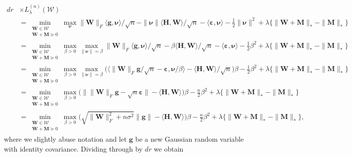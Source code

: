 \documentclass[10pt]{article}
\newcommand{\eps}{\ensuremath{\varepsilon}}
\theoremstyle{definition}
\begin{document}
\begin{align}
dr & \times L_{\lambda}^{(n)} (\mathcal{W}) \\
&= \min_ {\substack{\bm{W} \in \mathcal{W}\\ \bm{W} + \bm{M} \succcurlyeq 0}} \max_{\bm{\nu}} \| \bm{W} \|_F \langle \bm{g}, \bm{\nu} \rangle/\sqrt{n} - \| \bm{\nu}\| \langle \bm{H}, \bm{W}
    \rangle /\sqrt{n}- \langle \bm{\eps}, \bm{\nu} \rangle - \frac{1}{2} \| \bm{\nu} \|^2 + \lambda \big\{  \| \bm{W} + \bm{M}\|_* -  \| \bm{M} \|_* \big\}\\
    &=     \min_ {\substack{\bm{W} \in \mathcal{W}\\ \bm{W} + \bm{M} \succcurlyeq 0}} \max_{\beta > 0} \max_{\|\bm{\nu}\| = \beta}\| \bm{W} \|_F \langle \bm{g}, \bm{\nu} \rangle /\sqrt{n} - \beta  \langle \bm{H}, \bm{W}
    \rangle /\sqrt{n} - \langle \bm{\eps}, \bm{\nu} \rangle - \frac{1}{2} \beta^2 + \lambda \big\{ \| \bm{W} + \bm{M}\|_* -  \| \bm{M} \|_* \big\}\\
    &= \min_ {\substack{\bm{W} \in \mathcal{W}\\ \bm{W} + \bm{M} \succcurlyeq 0}} \max_{\beta > 0} \max_{\|\bm{\nu}\| = \beta} \bigg(  \big\langle\| \bm{W} \|_F \bm{g}/\sqrt{n}- \bm{\eps},  \bm{\nu}/\beta  \big\rangle - \langle \bm{H}, \bm{W}
    \rangle /\sqrt{n}\bigg) \beta  - \frac{1}{2} \beta^2 + \lambda \big\{ \| \bm{W} + \bm{M} \|_*-  \| \bm{M} \|_* \big\}\\
    &= \min_ {\substack{\bm{W} \in \mathcal{W}\\ \bm{W} + \bm{M} \succcurlyeq 0}} \max_{\beta > 0} \bigg( \big\| \| \bm{W} \|_F \bm{g}-  \sqrt{n}\bm{\eps} \big\| -  \langle \bm{H}, \bm{W} \rangle \bigg) \beta
     - \frac{n}{2} \beta^2 + \lambda \big\{ \| \bm{W} + \bm{M} \|_* -\| \bm{M} \|_* \big\} \\
     &= \min_ {\substack{\bm{W} \in \mathcal{W}\\ \bm{W} + \bm{M} \succcurlyeq 0}} \max_{\beta > 0} \bigg( \sqrt{ \| \bm{W}\|_F^2 + n \sigma^2} \| \bm{g} \| -  \langle \bm{H}, \bm{W} \rangle \bigg) \beta
     - \frac{n}{2} \beta^2 + \lambda\big\{ \| \bm{W} + \bm{M} \|_* - \| \bm{M} \|_* \big\}, \label{L_lambda_derivation}
\end{align}
where we slightly abuse notation and let $\bm{g}$ be a new Gaussian random variable with identity covariance.  Dividing through by $dr$ we obtain
\end{document}
